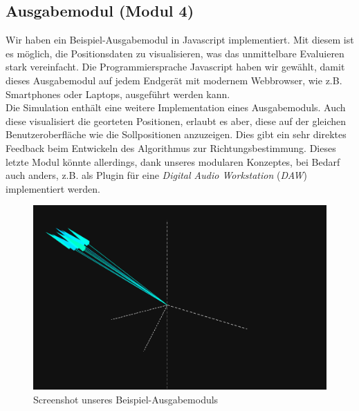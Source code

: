 \subsection{Ausgabemodul (Modul 4)}
Wir haben ein Beispiel-Ausgabemodul in Javascript implementiert. Mit diesem ist es möglich, die Positionsdaten zu visualisieren, was das unmittelbare Evaluieren stark vereinfacht. Die Programmiersprache Javascript haben wir gewählt, damit dieses Ausgabemodul auf jedem Endgerät mit modernem Webbrowser, wie z.B. Smartphones oder Laptops, ausgeführt werden kann.\\
Die Simulation enthält eine weitere Implementation eines Ausgabemoduls. Auch diese visualisiert die georteten Positionen, erlaubt es aber, diese auf der gleichen Benutzeroberfläche wie die Sollpositionen anzuzeigen. Dies gibt ein sehr direktes Feedback beim Entwickeln des Algorithmus zur Richtungsbestimmung. Dieses letzte Modul könnte allerdings, dank unseres modularen Konzeptes, bei Bedarf auch anders, z.B. als Plugin für eine \textit{Digital Audio Workstation} (\textit{DAW}) implementiert werden.
\begin{figure}[H]
  \centering
  \includegraphics[width=\textwidth]{img/soundLocateViewer.png}
  \caption{Screenshot unseres Beispiel-Ausgabemoduls}
  \label{fig:output}
\end{figure}
